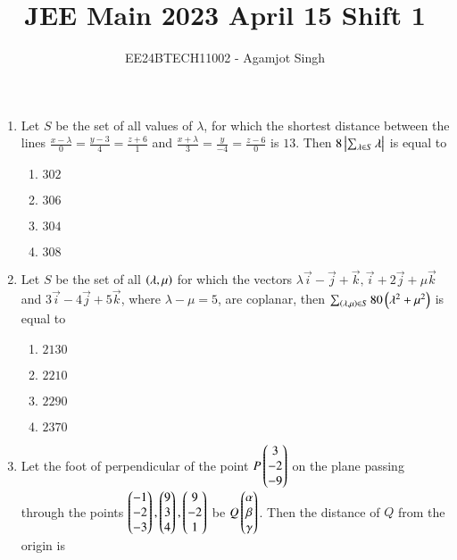 \documentclass[journal,onecolumn]{IEEEtran}
\theoremstyle{remark}
\begin{document}

\vspace{3cm}

\title{JEE Main 2023 April 15 Shift 1}
\author{EE24BTECH11002 - Agamjot Singh}
\maketitle

\renewcommand{\thefigure}{\theenumi}
\renewcommand{\thetable}{\theenumi}

\begin{enumerate}
    \item Let $S$ be the set of all values of $\lambda$, for which the shortest distance between the lines $\frac{x - \lambda}{0} = \frac{y - 3}{4} = \frac{z + 6}{1}$ and $\frac{x + \lambda}{3} = \frac{y}{-4} = \frac{z - 6}{0}$ is $13$. Then $8\left\vert\sum_{\lambda \in S} \lambda\right\vert$ is equal to

	\begin{enumerate}
		\item $302$ 
		\item $306$
		\item $304$
		\item $308$
	\end{enumerate}

    \item Let $S$ be the set of all $\left(\lambda, \mu\right)$ for which the vectors $\lambda\vec{i} - \vec{j} + \vec{k}, \vec{i} + 2\vec{j} + \mu\vec{k}$ and $3\vec{i} -4\vec{j} + 5\vec{k}$, where $\lambda - \mu  = 5$, are coplanar, then $\sum_{\left(\lambda, \mu\right) \in S} 80\left(\lambda^2 + \mu^2\right)$ is equal to

	\begin{enumerate}
		\item $2130$ 
		\item $2210$
		\item $2290$
		\item $2370$
	\end{enumerate}

    \item Let the foot of perpendicular of the point $P\begin{pmatrix}3\\-2\\-9\end{pmatrix}$ on the plane passing through the points $\begin{pmatrix}-1\\-2\\-3\end{pmatrix}, \begin{pmatrix}9\\3\\4\end{pmatrix}, \begin{pmatrix}9\\-2\\1\end{pmatrix}$ be $Q\begin{pmatrix}\alpha\\\beta\\\gamma\end{pmatrix}$. Then the distance of $Q$ from the origin is


\end{enumerate}
\end{document}
